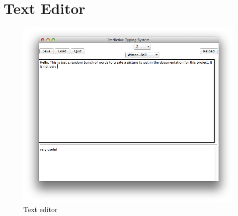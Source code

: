 \documentclass[twoside]{article}
\begin{document}
\appendix
\section{Text Editor}

\begin{figure}[hT!]
        \label{image:editor}
        \includegraphics[width=\textwidth]{editor.png}
        \caption{Text editor}
\end{figure}
\end{document}
